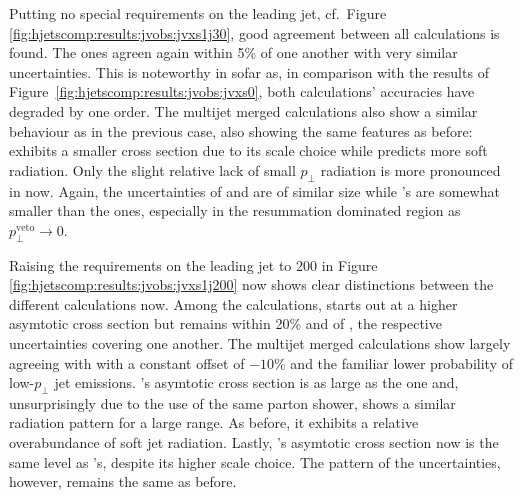 Putting no special requirements on the leading jet, cf.\ Figure 
\ref{fig:hjetscomp:results:jvobs:jvxs1j30}, good agreement 
between all calculations is found. The \NNLOPS ones agreen again within 
5\% of one another with very similar uncertainties. This is noteworthy 
in sofar as, in comparison with the results of 
Figure~\ref{fig:hjetscomp:results:jvobs:jvxs0}, both calculations' 
accuracies have degraded by one order. The multijet merged calculations 
also show a similar behaviour as in the previous case, also showing the 
same features as before: \MGaMC exhibits a smaller cross section due to 
its scale choice while \Sherpa \MEPSatNLO predicts more soft radiation. 
Only the slight relative lack of small $p_\perp$ radiation is more 
pronounced in \Herwig now. Again, the uncertainties of \MGaMC and \Sherpa 
are of similar size while \Herwig's are somewhat smaller than the \NNLOPS 
ones, especially in the resummation dominated region as 
$p_\perp^\text{veto}\to 0$.

Raising the requirements on the leading jet to $200$ \gev in Figure 
\ref{fig:hjetscomp:results:jvobs:jvxs1j200} now shows clear distinctions 
between the different calculations now. Among the \NNLOPS calculations, 
\Sherpa starts out at a higher asymtotic cross section but remains within 
20\% and of \Powheg, the respective uncertainties covering one another. 
The multijet merged calculations show \Herwig largely agreeing with 
\Powheg with a constant offset of $-10\%$ and the familiar lower 
probability of low-$p_\perp$ jet emissions. \Sherpa \MEPSatNLO's 
asymtotic cross section is as large as the \Sherpa \NNLOPS one and, 
unsurprisingly due to the use of the same parton shower, shows a 
similar radiation pattern for a large range. As before, it exhibits 
a relative overabundance of soft jet radiation. Lastly, \MGaMC's 
asymtotic cross section now is the same level as \Powheg's, despite 
its higher scale choice. The pattern of the uncertainties, however, 
remains the same as before.

